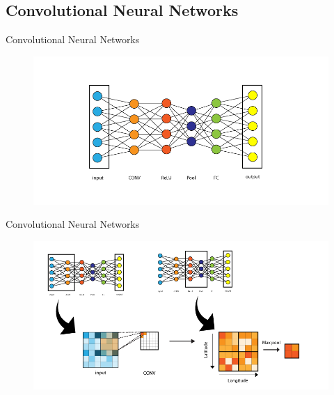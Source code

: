 \documentclass{beamer}
\begin{document}
\subsection*{Convolutional Neural Networks}
\begin{frame}{Convolutional Neural Networks}{}
\begin{figure}[h]
    \centering
    \includegraphics[width=\textwidth]{cnn-1.png}
\end{figure}
\end{frame}

\begin{frame}{Convolutional Neural Networks}{}
\begin{figure}[h]
    \centering
    \includegraphics[width=\textwidth]{cnn-2.png}
\end{figure}
\end{frame}
\end{document}
